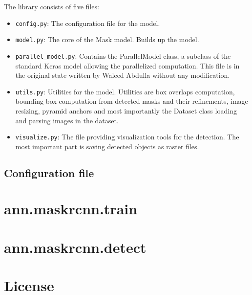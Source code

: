 The library consists of five files:
\begin{itemize}
	\item \verb|config.py|: The configuration file for the model. 
	 \item \verb|model.py|: The core of the Mask  model. Builds up the model.
	 \item \verb|parallel_model.py|: Contains the ParallelModel class, a subclass of the standard Keras model allowing the parallelized computation. This file is in the original state written by Waleed Abdulla without any modification.
	 \item \verb|utils.py|: Utilities for the model. Utilities are box overlaps computation, bounding box computation from detected masks and their refinements, image resizing, pyramid anchors and most importantly the Dataset class loading and parsing images in the dataset.
	 \item \verb|visualize.py|: The file providing visualization tools for the detection. The most important part is saving detected objects as raster files.
\end{itemize}

\subsection{Configuration file}
\label{config}



\section{ann.maskrcnn.train}
\label{train-module}

\section{ann.maskrcnn.detect}
\label{detect-module}

\section{License}
\label{license}